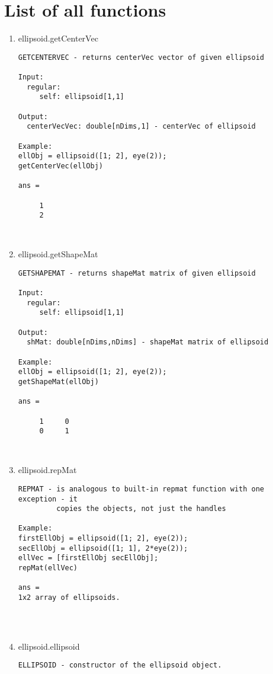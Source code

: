 \section{List of all functions}
\begin{enumerate}
\item {ellipsoid.getCenterVec}
\selectfont
\begin{lstlisting}
GETCENTERVEC - returns centerVec vector of given ellipsoid

Input:
  regular:
     self: ellipsoid[1,1]

Output:
  centerVecVec: double[nDims,1] - centerVec of ellipsoid

Example:
ellObj = ellipsoid([1; 2], eye(2));
getCenterVec(ellObj)

ans =

     1
     2



\end{lstlisting}
\fontfamily{\familydefault}
\selectfont
\item {ellipsoid.getShapeMat}
\selectfont
\begin{lstlisting}
GETSHAPEMAT - returns shapeMat matrix of given ellipsoid

Input:
  regular:
     self: ellipsoid[1,1]

Output:
  shMat: double[nDims,nDims] - shapeMat matrix of ellipsoid

Example:
ellObj = ellipsoid([1; 2], eye(2));
getShapeMat(ellObj)

ans =

     1     0
     0     1



\end{lstlisting}
\fontfamily{\familydefault}
\selectfont
\item {ellipsoid.repMat}
\selectfont
\begin{lstlisting}
REPMAT - is analogous to built-in repmat function with one exception - it
         copies the objects, not just the handles

Example:
firstEllObj = ellipsoid([1; 2], eye(2));
secEllObj = ellipsoid([1; 1], 2*eye(2));
ellVec = [firstEllObj secEllObj];
repMat(ellVec)

ans =
1x2 array of ellipsoids.




\end{lstlisting}
\fontfamily{\familydefault}
\selectfont
\item {ellipsoid.ellipsoid}
\selectfont
\begin{lstlisting}
ELLIPSOID - constructor of the ellipsoid object.


\end{lstlisting}
\end{enumerate}
